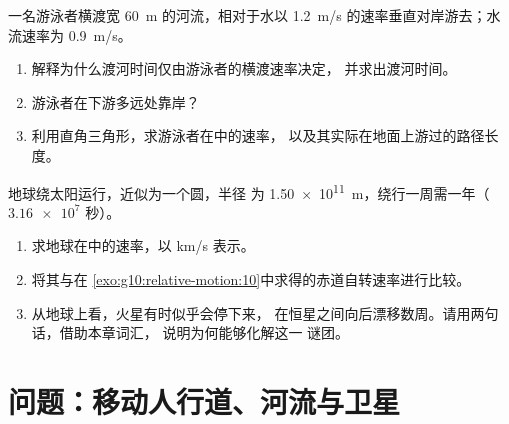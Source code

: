 \begin{exercise}[$\star\star\star$]\label{exo:g10:relative-motion:14}
一名游泳者横渡宽 \qty{60}{m} 的河流，相对于水以
\qty{1.2}{m/s} 的速率垂直对岸游去；水流速率为
\qty{0.9}{m/s}。
\begin{enumerate}
  \item 解释为什么渡河时间仅由游泳者的横渡速率决定，
        并求出渡河时间。
  \item 游泳者在下游多远处靠岸？
  \item 利用直角三角形，求游泳者在中的速率，
        以及其实际在地面上游过的路径长度。
\end{enumerate}
\end{exercise}

\begin{exercise}[$\star\star\star$]\label{exo:g10:relative-motion:15}
地球绕太阳运行，近似为一个圆，半径
为 \qty{1.50e11}{m}，绕行一周需一年（$\num{3.16e7}$ 秒）。
\begin{enumerate}
  \item 求地球在中的速率，以
        \unit{km/s} 表示。
  \item 将其与在
        \cref{exo:g10:relative-motion:10}中求得的赤道自转速率进行比较。
  \item 从地球上看，火星有时似乎会停下来，
        在恒星之间向后漂移数周。请用两句话，借助本章词汇，
        说明为何能够化解这一
        谜团。
\end{enumerate}
\end{exercise}

\section{问题：移动人行道、河流与卫星}

